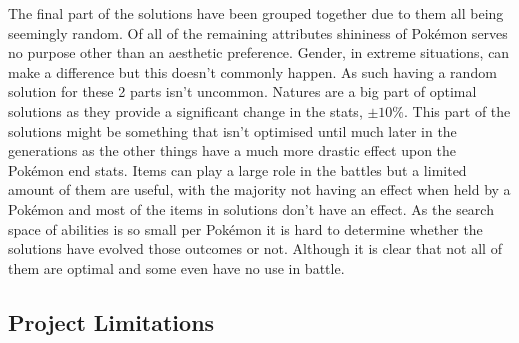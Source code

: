 \documentclass[a4paper]{article}
\newcommand{\Pokemon}{Pok\'{e}mon}
\begin{document}
\par
The final part of the solutions have been grouped together due to them all being seemingly random.
Of all of the remaining attributes shininess of \Pokemon{} serves no purpose other than an aesthetic preference.
Gender, in extreme situations, can make a difference but this doesn't commonly happen.
As such having a random solution for these 2 parts isn't uncommon.
Natures are a big part of optimal solutions as they provide a significant change in the stats, $\pm 10\%$.
This part of the solutions might be something that isn't optimised until much later in the generations as the other things have a much more drastic effect upon the \Pokemon{} end stats.
Items can play a large role in the battles but a limited amount of them are useful, with the majority not having an effect when held by a \Pokemon{} and most of the items in solutions don't have an effect.
As the search space of abilities is so small per \Pokemon{} it is hard to determine whether the solutions have evolved those outcomes or not.
Although it is clear that not all of them are optimal and some even have no use in battle.
\subsection{Project Limitations}
\end{document}
